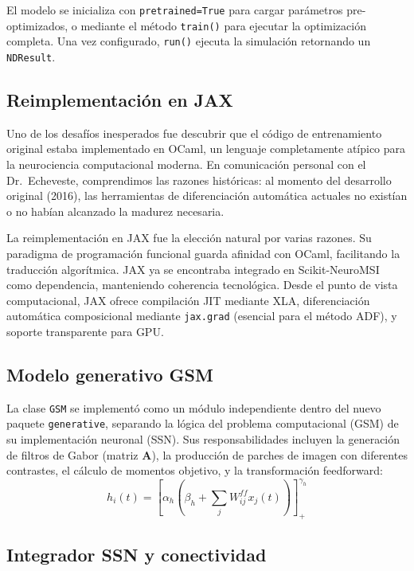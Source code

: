 \documentclass[spanish,a4paper,11pt]{article}
\begin{document}
El modelo se inicializa con \texttt{pretrained=True} para cargar parámetros pre-optimizados, o mediante el método \texttt{train()} para ejecutar la optimización completa. Una vez configurado, \texttt{run()} ejecuta la simulación retornando un \texttt{NDResult}.

\subsection{Reimplementación en JAX}

Uno de los desafíos inesperados fue descubrir que el código de entrenamiento original estaba implementado en OCaml, un lenguaje completamente atípico para la neurociencia computacional moderna. En comunicación personal con el Dr.\ Echeveste, comprendimos las razones históricas: al momento del desarrollo original (2016), las herramientas de diferenciación automática actuales no existían o no habían alcanzado la madurez necesaria.

La reimplementación en JAX fue la elección natural por varias razones. Su paradigma de programación funcional guarda afinidad con OCaml, facilitando la traducción algorítmica. JAX ya se encontraba integrado en Scikit-NeuroMSI como dependencia, manteniendo coherencia tecnológica. Desde el punto de vista computacional, JAX ofrece compilación JIT mediante XLA, diferenciación automática composicional mediante \texttt{jax.grad} (esencial para el método ADF), y soporte transparente para GPU.

\subsection{Modelo generativo GSM}

La clase \texttt{GSM} se implementó como un módulo independiente dentro del nuevo paquete \texttt{generative}, separando la lógica del problema computacional (GSM) de su implementación neuronal (SSN). Sus responsabilidades incluyen la generación de filtros de Gabor (matriz $\mathbf{A}$), la producción de parches de imagen con diferentes contrastes, el cálculo de momentos objetivo, y la transformación feedforward:
\begin{equation}
h_i(t) = \left[ \alpha_h \left( \beta_h + \sum_j W_{ij}^{ff} x_j(t) \right) \right]_+^{\gamma_h}
\label{eq:ff}
\end{equation}

\subsection{Integrador SSN y conectividad}
\end{document}
